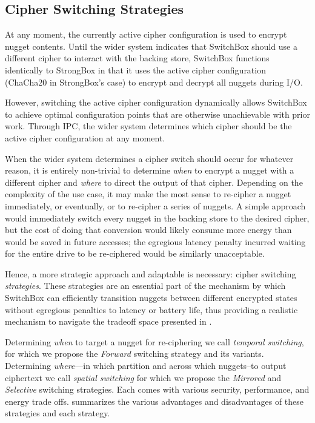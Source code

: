 \subsection{Cipher Switching Strategies}

At any moment, the currently active cipher configuration is used to encrypt
nugget contents. Until the wider system indicates that SwitchBox should use a
different cipher to interact with the backing store, SwitchBox functions
identically to StrongBox in that it uses the active cipher configuration
(ChaCha20 in StrongBox's case) to encrypt and decrypt all nuggets during I/O.

However, switching the active cipher configuration dynamically allows SwitchBox
to achieve optimal configuration points that are otherwise unachievable with
prior work. Through IPC, the wider system determines which cipher should be the
active cipher configuration at any moment.

When the wider system determines a cipher switch should occur for whatever
reason, it is entirely non-trivial to determine \emph{when} to encrypt a nugget
with a different cipher and \emph{where} to direct the output of that cipher.
Depending on the complexity of the use case, it may make the most sense to
re-cipher a nugget immediately, or eventually, or to re-cipher a series of
nuggets. A simple approach would immediately switch every nugget in the backing
store to the desired cipher, but the cost of doing that conversion would likely
consume more energy than would be saved in future accesses; the egregious
latency penalty incurred waiting for the entire drive to be re-ciphered would be
similarly unacceptable.

Hence, a more strategic approach and adaptable is necessary: cipher switching
\emph{strategies}. These strategies are an essential part of the mechanism by
which SwitchBox can efficiently transition nuggets between different encrypted
states without egregious penalties to latency or battery life, thus providing a
realistic mechanism to navigate the tradeoff space presented in
.

Determining \emph{when} to target a nugget for re-ciphering we call
\emph{temporal switching}, for which we propose the \emph{Forward} switching
strategy and its variants. Determining \emph{where}---in which partition and
across which nuggets--to output ciphertext we call \emph{spatial switching} for
which we propose the \emph{Mirrored} and \emph{Selective} switching strategies.
Each comes with various security, performance, and energy trade offs.
 summarizes the various advantages and
disadvantages of these strategies and each strategy.


